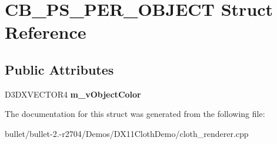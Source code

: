 \hypertarget{struct_c_b___p_s___p_e_r___o_b_j_e_c_t}{\section{C\+B\+\_\+\+P\+S\+\_\+\+P\+E\+R\+\_\+\+O\+B\+J\+E\+C\+T Struct Reference}
\label{struct_c_b___p_s___p_e_r___o_b_j_e_c_t}
}
\subsection*{Public Attributes}
\begin{DoxyCompactItemize}
\item 
\hypertarget{struct_c_b___p_s___p_e_r___o_b_j_e_c_t_acce540bce6fb9095bc1be6f343e6174f}{D3\+D\+X\+V\+E\+C\+T\+O\+R4 {\bfseries m\+\_\+v\+Object\+Color}}\label{struct_c_b___p_s___p_e_r___o_b_j_e_c_t_acce540bce6fb9095bc1be6f343e6174f}

\end{DoxyCompactItemize}


The documentation for this struct was generated from the following file\+:\begin{DoxyCompactItemize}
\item 
bullet/bullet-\/2.-\/r2704/\+Demos/\+D\+X11\+Cloth\+Demo/cloth\+\_\+renderer.\+cpp\end{DoxyCompactItemize}
